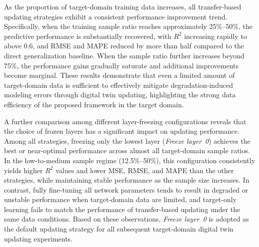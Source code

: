\documentclass[a4paper,10pt]{cas-sc}%
\begin{document}
As the proportion of target-domain training data increases, all transfer-based updating strategies exhibit a consistent performance improvement trend. Specifically, when the training sample ratio reaches approximately 25\%--50\%, the predictive performance is substantially recovered, with \(R^2\) increasing rapidly to above 0.6, and RMSE and MAPE reduced by more than half compared to the direct generalization baseline. When the sample ratio further increases beyond 75\%, the performance gains gradually saturate and additional improvements become marginal. These results demonstrate that even a limited amount of target-domain data is sufficient to effectively mitigate degradation-induced modeling errors through digital twin updating, highlighting the strong data efficiency of the proposed framework in the target domain.

A further comparison among different layer-freezing configurations reveals that the choice of frozen layers has a significant impact on updating performance. Among all strategies, freezing only the lowest layer (\emph{Freeze layer~0}) achieves the best or near-optimal performance across almost all target-domain sample ratios. In the low-to-medium sample regime (12.5\%--50\%), this configuration consistently yields higher \(R^2\) values and lower MSE, RMSE, and MAPE than the other strategies, while maintaining stable performance as the sample size increases. In contrast, fully fine-tuning all network parameters tends to result in degraded or unstable performance when target-domain data are limited, and target-only learning fails to match the performance of transfer-based updating under the same data conditions. Based on these observations, \emph{Freeze layer~0} is adopted as the default updating strategy for all subsequent target-domain digital twin updating experiments.
\end{document}
